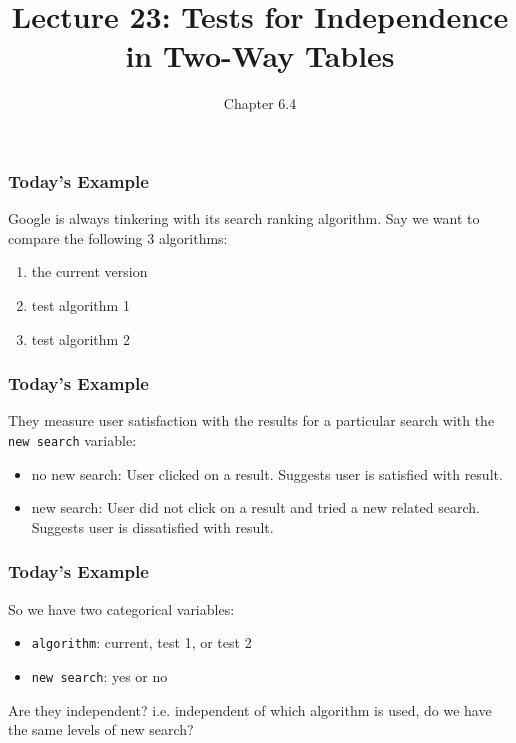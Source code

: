 \documentclass[handout]{beamer}
\title{Lecture 23: Tests for Independence in Two-Way Tables}
\author{Chapter 6.4}
\date{}
\newcommand{\blue}[1]{\textcolor{blue2}{#1}}
\begin{document}
\begin{frame}
\titlepage
\end{frame}



\begin{frame}
\frametitle{Today's Example}
Google is always tinkering with its search ranking \blue{algorithm}.  Say we want to compare the following 3 algorithms:
\begin{enumerate}
\item the current version
\item test algorithm 1
\item test algorithm 2
\end{enumerate}

\end{frame}


\begin{frame}
\frametitle{Today's Example}

They measure user satisfaction with the results for a particular search with the \blue{{\tt new search}} variable:
\begin{itemize}
\pause\item no new search: User clicked on a result. Suggests user is satisfied with result.
\pause\item new search: User did not click on a result and tried a new related search.  Suggests user is \blue{dissatisfied} with result.
\end{itemize}


\end{frame}


\begin{frame}
\frametitle{Today's Example}
So we have two categorical variables:
\begin{itemize}
\item {\tt algorithm}: current, test 1, or test 2
\item {\tt new search}: yes or no
\end{itemize}

\vspace{0.25cm}

\pause Are they independent?  i.e. independent of which algorithm is used, do we have the same levels of new search?


\end{frame}
\end{document}
